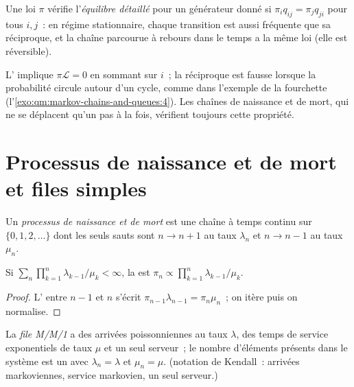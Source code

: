 \begin{definition}\label{def:qm:markov-chains-and-queues:balance}
Une loi $\pi$ vérifie l'\emph{équilibre détaillé} pour un générateur donné si $\pi_iq_{ij} =
\pi_jq_{ji}$ pour tous $i, j$~: en régime stationnaire, chaque transition est aussi fréquente que sa réciproque, et la chaîne parcourue
à rebours dans le temps a la même loi (elle est réversible).
\end{definition}

L' implique $\pi\mathcal L = 0$ en sommant sur $i$~; la réciproque est fausse lorsque la probabilité circule
autour d'un cycle, comme dans l'exemple de la fourchette (l'\cref{exo:qm:markov-chains-and-queues:4}). Les chaînes de naissance et de mort,
qui ne se déplacent qu'un pas à la fois, vérifient toujours cette propriété.

\section{Processus de naissance et de mort et files simples}

\begin{definition}\label{def:qm:markov-chains-and-queues:bd}
Un \emph{processus de naissance et de mort} est une chaîne à temps continu sur $\{0, 1, 2, \dots\}$ dont les seuls
sauts sont $n \to n + 1$ au taux $\lambda_n$ et $n \to n - 1$ au taux $\mu_n$.
\end{definition}

\begin{proposition}\label{prop:qm:markov-chains-and-queues:bdstat}
Si $\sum_n\prod_{k=1}^n\lambda_{k-1}/\mu_k < \infty$, la  est $\pi_n \propto \prod_{k=1}^n\lambda_{k-1}/\mu_k$.
\end{proposition}

\begin{proof}
L' entre $n - 1$ et $n$ s'écrit $\pi_{n-1}\lambda_{n-1} = \pi_n\mu_n$~; on itère puis on normalise.
\end{proof}

\begin{definition}[File M/M/1]\label{def:qm:markov-chains-and-queues:mm1}
La \emph{file M/M/1} a des arrivées poissonniennes au taux $\lambda$, des temps de service exponentiels de
taux $\mu$ et un seul serveur~; le nombre d'éléments présents dans le système est un  avec $\lambda_n = \lambda$ et $\mu_n =
\mu$. (notation de Kendall~: arrivées markoviennes, service markovien, un seul serveur.)
\end{definition}

